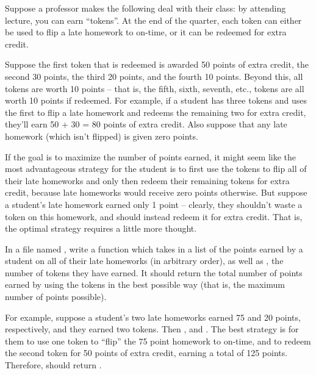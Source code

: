 \begin{prob}
    Suppose a professor makes the following deal with their class: by attending
    lecture, you can earn ``tokens''. At the end of the quarter, each token can either
    be used to flip a late homework to on-time, or it can be redeemed for extra credit.

    Suppose the first token that is redeemed is awarded 50 points of extra
    credit, the second 30 points, the third 20 points, and the fourth 10
    points. Beyond this, all tokens are worth 10 points -- that is, the fifth,
    sixth, seventh, etc., tokens are all worth 10 points if redeemed. For
    example, if a student has three tokens and uses the first to flip a late
    homework and redeems the remaining two for extra credit, they'll earn 50 +
    30 = 80 points of extra credit. Also suppose that any late homework (which
    isn't flipped) is given zero points.

    If the goal is to maximize the number of points earned, it might seem like
    the most advantageous strategy for the student is to first use the tokens
    to flip all of their late homeworks and only then redeem their remaining
    tokens for extra credit, because late homeworks would receive zero points
    otherwise. But suppose a student's late homework earned only 1 point --
    clearly, they shouldn't waste a token on this homework, and should instead
    redeem it for extra credit. That is, the optimal strategy requires a little
    more thought.

    In a file named , write a function
     which takes in a list
     of the points earned by a student on all of their late
    homeworks (in arbitrary order), as well as , the number of tokens they have
    earned. It should return the total number of points earned by using the
    tokens in the best possible way (that is, the maximum number of points
    possible).

    For example, suppose a student's two late homeworks earned 75 and 20 points, respectively, and
    they earned two tokens.
    Then , and . The best strategy is for them to use
    one token to ``flip'' the 75 point homework to on-time, and to redeem the second token
    for 50 points of extra credit, earning a total of 125 points. Therefore, 
    should return .


\end{prob}
